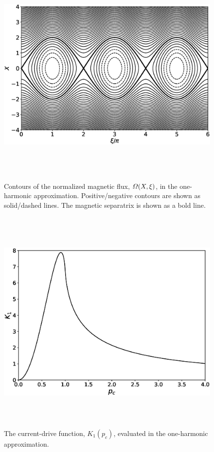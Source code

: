 \documentclass[12pt,prb,aps]{revtex4-1}
\begin{document}
\newpage
\begin{figure}
\centerline{\includegraphics[height=4.5in]{Figure1.eps}}
\caption{Contours of the normalized magnetic flux, ${\mit\Omega}(X,\xi)$, in the one-harmonic approximation. Positive/negative contours are shown as solid/dashed lines. The magnetic separatrix is shown
as a  bold line.}\label{fig1}
\end{figure}

\begin{figure}
\centerline{\includegraphics[height=4.5in]{Figure2.eps}}
\caption{The current-drive function, $K_1(p_c)$, evaluated in the one-harmonic approximation.}\label{fig2}
\end{figure}
\end{document}

